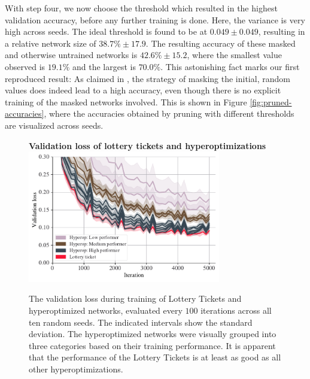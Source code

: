 \documentclass[12pt,final,twoside]{article}
\theoremstyle{plain}
\theoremstyle{definition}
\theoremstyle{remark}
\theoremstyle{named}
\begin{document}
With step four, we now choose the threshold which resulted in the highest validation accuracy, before any further training is done. Here, the variance is very high across seeds. The ideal threshold is found to be at $0.049 \pm 0.049$, resulting in a relative network size of $38.7\% \pm 17.9$. The resulting accuracy of these masked and otherwise untrained networks is $42.6\% \pm 15.2$, where the smallest value observed is $19.1\%$ and the largest is $70.0\%$. This astonishing fact marks our first reproduced result: As claimed in \cite{supermask}, the strategy of masking the initial, random values does indeed lead to a high accuracy, even though there is no explicit training of the masked networks involved. This is shown in Figure \ref{fig:pruned-accuracies}, where the accuracies obtained by pruning with different thresholds are visualized across seeds.

\begin{figure}[t]
  \centering
  \textbf{Validation loss of lottery tickets and hyperoptimizations}
  \includegraphics[width=0.75\textwidth]{plots/lt-loss.pdf}
  \caption{The validation loss during training of Lottery Tickets and hyperoptimized networks, evaluated every $100$ iterations across all ten random seeds. The indicated intervals show the standard deviation. The hyperoptimized networks were visually grouped into three categories based on their training performance. It is apparent that the performance of the Lottery Tickets is at least as good as all other hyperoptimizations.}
  \label{fig:lt-loss}
\end{figure}
\end{document}
